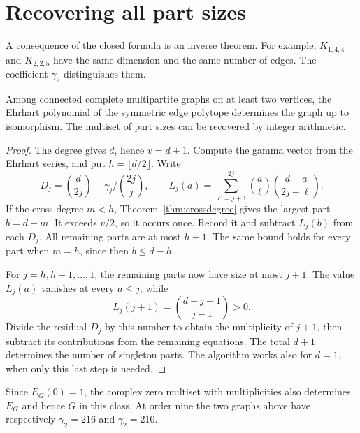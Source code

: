 \section{Recovering all part sizes}\label{sec:inverse}
A consequence of the closed formula is an inverse theorem. For example,
$K_{1,4,4}$ and $K_{2,2,5}$ have the same dimension and the same number
of edges. The coefficient $\gamma_2$ distinguishes them.

\begin{theorem}[Reconstruction]\label{thm:inverse}
Among connected complete multipartite graphs on at least two vertices,
the Ehrhart polynomial of the symmetric edge polytope determines the graph
up to isomorphism. The multiset of part sizes can be recovered by integer
arithmetic.
\end{theorem}
\begin{proof}
The degree gives $d$, hence $v=d+1$. Compute the gamma vector from the
Ehrhart series, and put $h=\lfloor d/2\rfloor$. Write
\[
 D_j=\binom d{2j}-\gamma_j/\binom{2j}{j},\qquad
 L_j(a)=\sum_{\ell=j+1}^{2j}\binom a\ell\binom{d-a}{2j-\ell}.
\]
If the cross-degree $m<h$, Theorem~\ref{thm:crossdegree} gives the
largest part $b=d-m$. It exceeds $v/2$, so it occurs once.
Record it and subtract $L_j(b)$ from each $D_j$.
All remaining parts are at most $h+1$. The same bound holds for every
part when $m=h$, since then $b\le d-h$.

For $j=h,h-1,\ldots,1$, the remaining parts now have size at most $j+1$.
The value $L_j(a)$ vanishes at every $a\le j$, while
\[
 L_j(j+1)=\binom{d-j-1}{j-1}>0 .
\]
Divide the residual $D_j$ by this number to obtain the multiplicity of
$j+1$, then subtract its contributions from the remaining equations.
The total $d+1$ determines the number of singleton parts. The algorithm
works also for $d=1$, when only this last step is needed.
\end{proof}
Since $E_G(0)=1$, the complex zero multiset with multiplicities also
determines $E_G$ and hence $G$ in this class. At order nine the two
graphs above have respectively $\gamma_2=216$ and $\gamma_2=210$.
